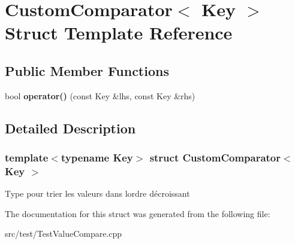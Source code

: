 \hypertarget{structCustomComparator}{}\section{Custom\+Comparator$<$ Key $>$ Struct Template Reference}
\label{structCustomComparator}
\subsection*{Public Member Functions}
\begin{DoxyCompactItemize}
\item 
\mbox{\label{structCustomComparator_a18b7463e92fc74beaa5f2c41908bcdfe}} 
bool {\bfseries operator()} (const Key \&lhs, const Key \&rhs)
\end{DoxyCompactItemize}


\subsection{Detailed Description}
\subsubsection*{template$<$typename Key$>$\newline
struct Custom\+Comparator$<$ Key $>$}

Type pour trier les valeurs dans l\textquotesingle{}ordre décroissant 

The documentation for this struct was generated from the following file\+:\begin{DoxyCompactItemize}
\item 
src/test/Test\+Value\+Compare.\+cpp\end{DoxyCompactItemize}

